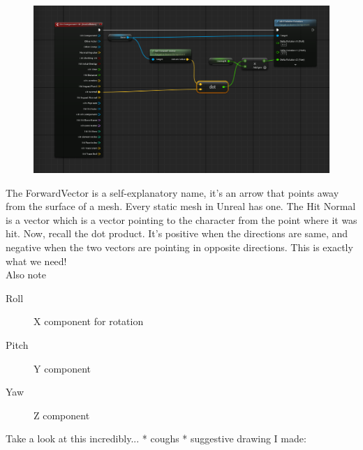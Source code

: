 \documentclass[]{article}
\begin{document}
	\begin{figure}[h]
		\centering
		\includegraphics[width=1\linewidth]{day4images/screenshot011}
		\label{fig:screenshot011}
	\end{figure}
	
	The ForwardVector is a self-explanatory name, it's an arrow that points away from the surface of a mesh. Every static mesh in Unreal has one. The Hit Normal is a vector which is a vector pointing to the character from the point where it was hit. Now, recall the dot product. It's positive when the directions are same, and negative when the two vectors are pointing in opposite directions. This is exactly what we need! 
	\\[10pt]
	Also note
	\begin{description}
		\item[Roll] X component for rotation
		\item[Pitch] Y component
		\item[Yaw] Z component
	\end{description}
	\newpage
	Take a look at this incredibly... * coughs * suggestive drawing I made:
	
\end{document}
